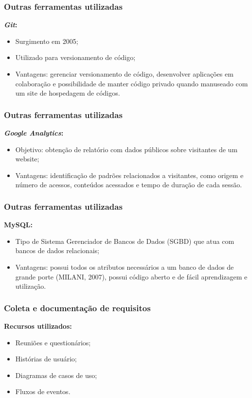 \documentclass{beamer}
\begin{document}
\begin{frame}
    \frametitle{Outras ferramentas utilizadas}
    \textbf{\textit{Git}:} 
    \begin{itemize}
        \item Surgimento em 2005;
        \item Utilizado para versionamento de código; %
        \item Vantagens: gerenciar versionamento de código, desenvolver aplicações em colaboração e possibilidade de manter código privado quando manuseado com um site de hospedagem de códigos.
    \end{itemize}
\end{frame}


\begin{frame}
    \frametitle{Outras ferramentas utilizadas}
    \textbf{\textit{Google Analytics}:} 
    \begin{itemize}
        \item Objetivo: obtenção de relatório com dados públicos sobre visitantes de um website;
        \item Vantagens: identificação de padrões relacionados a visitantes, como origem e número de acessos, conteúdos acessados e tempo de duração de cada sessão. %
    \end{itemize}
\end{frame}


\begin{frame}
    \frametitle{Outras ferramentas utilizadas}
    \textbf{MySQL:} 
    \begin{itemize}
        \item Tipo de Sistema Gerenciador de Bancos de Dados (SGBD) que atua com bancos de dados relacionais; %
        \item Vantagens: possui todos os atributos necessários a um banco de dados de grande porte (MILANI, 2007), possui código aberto e de fácil aprendizagem e utilização. 
    \end{itemize}
    
\end{frame}



\begin{frame}
    \frametitle{Coleta e documentação de requisitos}
    \textbf{Recursos utilizados:}
    \begin{itemize}
        \item Reuniões e questionários;
        \item Histórias de usuário;
        \item Diagramas de casos de uso;
        \item Fluxos de eventos.
    \end{itemize}
\end{frame}
\end{document}
